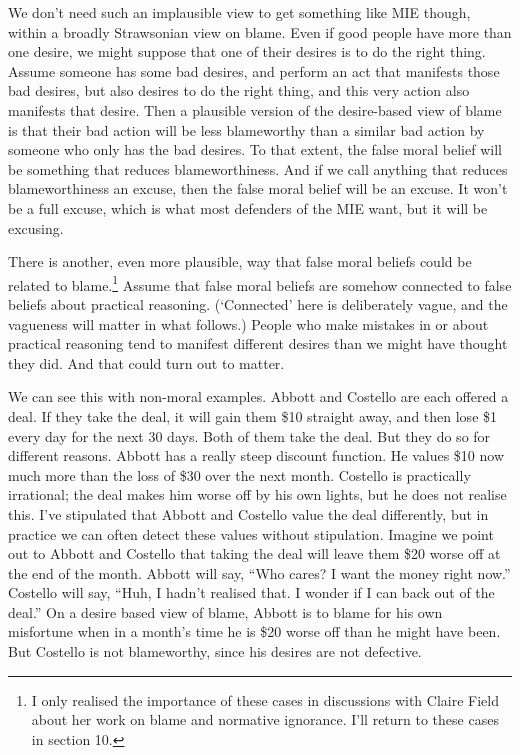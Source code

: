 We don't need such an implausible view to get something like MIE though, within a broadly Strawsonian view on blame. Even if good people have more than one desire, we might suppose that one of their desires is to do the right thing. Assume someone has some bad desires, and perform an act that manifests those bad desires, but also desires to do the right thing, and this very action also manifests that desire. Then a plausible version of the desire-based view of blame is that their bad action will be less blameworthy than a similar bad action by someone who only has the bad desires. To that extent, the false moral belief will be something that reduces blameworthiness. And if we call anything that reduces blameworthiness an excuse, then the false moral belief will be an excuse. It won't be a full excuse, which is what most defenders of the MIE want, but it will be excusing.

There is another, even more plausible, way that false moral beliefs could be related to blame.\footnote{I only realised the importance of these cases in discussions with Claire Field about her work on blame and normative ignorance. I'll return to these cases in section 10.} Assume that false moral beliefs are somehow connected to false beliefs about practical reasoning. (`Connected' here is deliberately vague, and the vagueness will matter in what follows.) People who make mistakes in or about practical reasoning tend to manifest different desires than we might have thought they did. And that could turn out to matter.

We can see this with non-moral examples. \gls{Abbott} and \gls{Costello} are each offered a deal. If they take the deal, it will gain them \$10 straight away, and then lose \$1 every day for the next 30 days. Both of them take the deal. But they do so for different reasons. \gls{Abbott} has a really steep discount function. He values \$10 now much more than the loss of \$30 over the next month. \gls{Costello} is practically irrational; the deal makes him worse off by his own lights, but he does not realise this. I've stipulated that \gls{Abbott} and \gls{Costello} value the deal differently, but in practice we can often detect these values without stipulation. Imagine we point out to \gls{Abbott} and \gls{Costello} that taking the deal will leave them \$20 worse off at the end of the month. \gls{Abbott} will say, ``Who cares? I want the money right now.'' \gls{Costello} will say, ``Huh, I hadn't realised that. I wonder if I can back out of the deal.'' On a desire based view of blame, \gls{Abbott} is to blame for his own misfortune when in a month's time he is \$20 worse off than he might have been. But \gls{Costello} is not blameworthy, since his desires are not defective.

